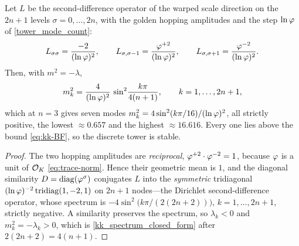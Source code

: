 \begin{proposition}\label{prop:kk-discrete-spectrum}
Let $L$ be the second-difference operator of the warped scale direction on the $2n+1$ levels
$\sigma=0,\dots,2n$, with the golden hopping amplitudes and the step $\ln\varphi$ of
\eqref{tower_mode_count}:
\begin{equation}\label{eq:kk-operator}
  L_{\sigma\sigma}=\frac{-2}{(\ln\varphi)^{2}},\qquad
  L_{\sigma,\sigma-1}=\frac{\varphi^{+2}}{(\ln\varphi)^{2}},\qquad
  L_{\sigma,\sigma+1}=\frac{\varphi^{-2}}{(\ln\varphi)^{2}} .
\end{equation}
Then, with $m^{2}=-\lambda$,
\begin{equation}\label{kk_spectrum_closed_form}
  m^{2}_{k}=\frac{4}{(\ln\varphi)^{2}}\,\sin^{2}\!\frac{k\pi}{4(n+1)},
  \qquad k=1,\dots,2n+1 ,
\end{equation}
which at $n=3$ gives seven modes $m^{2}_{k}=4\sin^{2}(k\pi/16)/(\ln\varphi)^{2}$, all strictly
positive, the lowest $\approx0.657$ and the highest $\approx16.616$. Every one lies above the bound
\eqref{eq:kk-BF}, so the discrete tower is stable.

\end{proposition}
\begin{proof}
The two hopping amplitudes are \emph{reciprocal}, $\varphi^{+2}\cdot\varphi^{-2}=1$, because
$\varphi$ is a unit of $\mathcal{O}_K$ \eqref{eq:trace-norm}. Hence their geometric mean is $1$, and the
diagonal similarity $D=\operatorname{diag}(\varphi^{\sigma})$ conjugates $L$ into the
\emph{symmetric} tridiagonal $(\ln\varphi)^{-2}\,\mathrm{tridiag}(1,-2,1)$ on $2n+1$ nodes---the
Dirichlet second-difference operator, whose spectrum is
$-4\sin^{2}\bigl(k\pi/(2(2n+2))\bigr)$, $k=1,\dots,2n+1$, strictly negative. A similarity preserves
the spectrum, so $\lambda_k<0$ and $m^{2}_k=-\lambda_k>0$, which is \eqref{kk_spectrum_closed_form} after
$2(2n+2)=4(n+1)$.
\end{proof}

